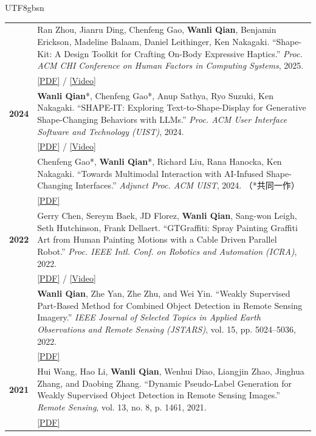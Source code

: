 \documentclass[12pt, letterpaper]{article}
\newlength{\datecolwidth}
\begin{document}
\begin{CJK*}{UTF8}{gbsn}
\begin{tabularx}{\textwidth}{@{}p{\datecolwidth} X@{}}
    & Ran Zhou, Jianru Ding, Chenfeng Gao, \textbf{Wanli Qian}, Benjamin Erickson, Madeline Balaam, Daniel Leithinger, Ken Nakagaki. ``Shape-Kit: A Design Toolkit for Crafting On-Body Expressive Haptics.'' \textit{Proc. ACM CHI Conference on Human Factors in Computing Systems}, 2025. \\
    & \href{https://dl.acm.org/doi/10.1145/3706599.3721280}{[PDF]} / \href{https://www.youtube.com/watch?v=W_rZg8f6lZM}{[Video]} \\[6pt]

    \textbf{2024} & \textbf{Wanli Qian}*, Chenfeng Gao*, Anup Sathya, Ryo Suzuki, Ken Nakagaki. ``SHAPE-IT: Exploring Text-to-Shape-Display for Generative Shape-Changing Behaviors with LLMs.'' \textit{Proc. ACM User Interface Software and Technology (UIST)}, 2024. \\
    & \href{https://dl.acm.org/doi/10.1145/3654777.3676348}{[PDF]} / \href{https://www.youtube.com/watch?v=2NxzOBc7AdQ}{[Video]} \\[6pt]

    & Chenfeng Gao*, \textbf{Wanli Qian}*, Richard Liu, Rana Hanocka, Ken Nakagaki. ``Towards Multimodal Interaction with AI-Infused Shape-Changing Interfaces.'' \textit{Adjunct Proc. ACM UIST}, 2024. （*共同一作） \\
    & \href{https://dl.acm.org/doi/10.1145/3672539.3686315}{[PDF]} \\[6pt]

    \textbf{2022} & Gerry Chen, Sereym Baek, JD Florez, \textbf{Wanli Qian}, Sang-won Leigh, Seth Hutchinson, Frank Dellaert. ``GTGraffiti: Spray Painting Graffiti Art from Human Painting Motions with a Cable Driven Parallel Robot.'' \textit{Proc. IEEE Intl. Conf. on Robotics and Automation (ICRA)}, 2022. \\
    & \href{https://ieeexplore.ieee.org/document/9812008}{[PDF]} / \href{https://www.youtube.com/watch?v=R4ySYTNGv6s}{[Video]} \\[6pt]

    & \textbf{Wanli Qian}, Zhe Yan, Zhe Zhu, and Wei Yin. 
    ``Weakly Supervised Part-Based Method for Combined Object Detection in Remote Sensing Imagery.'' 
    \textit{IEEE Journal of Selected Topics in Applied Earth Observations and Remote Sensing (JSTARS)}, 
    vol. 15, pp. 5024--5036, 2022. \\
    & \href{https://ieeexplore.ieee.org/document/9789416}{[PDF]} \\[6pt]

    \textbf{2021} & Hui Wang, Hao Li, \textbf{Wanli Qian}, Wenhui Diao, Liangjin Zhao, Jinghua Zhang, and Daobing Zhang. 
    ``Dynamic Pseudo-Label Generation for Weakly Supervised Object Detection in Remote Sensing Images.'' 
    \textit{Remote Sensing}, vol. 13, no. 8, p. 1461, 2021. \\
    & \href{https://www.mdpi.com/2072-4292/13/8/1461}{[PDF]} \\[6pt]
\end{tabularx}


\end{CJK*}
\end{document}
